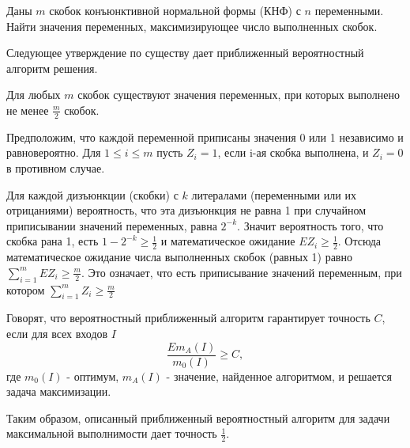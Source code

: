 \begin{problem}

 Даны $m$ скобок конъюнктивной нормальной формы (КНФ) с $n$ переменными. Найти значения переменных, максимизирующее число выполненных скобок.

\noindent  

\noindent Следующее утверждение по существу дает приближенный вероятностный алгоритм решения.

 Для любых $m$ скобок существуют значения переменных, при которых выполнено не менее $\frac{m}{2} $ скобок.

\noindent Предположим, что каждой переменной приписаны значения 0 или 1 независимо и равновероятно. Для $1\le i\le m$ пусть $Z_{i} =1$, если i-ая скобка выполнена, и $Z_{i} =0$ в противном случае.

\noindent Для каждой дизъюнкции (скобки) с $k$ литералами (переменными или их отрицаниями) вероятность, что эта дизъюнкция не равна 1 при случайном приписывании значений переменных, равна $2^{-k} $. Значит вероятность того, что скобка рана 1, есть $1-2^{-k} \ge \frac{1}{2} $ и математическое ожидание $EZ_{i} \ge \frac{1}{2} $. Отсюда математическое ожидание числа выполненных скобок (равных 1) равно $\sum _{i=1}^{m}EZ_{i}  \ge \frac{m}{2} $. Это означает, что есть приписывание значений переменным, при котором $\sum _{i=1}^{m}Z_{i}  \ge \frac{m}{2} $

 Говорят, что вероятностный приближенный алгоритм гарантирует точность $C$, если для всех входов $I$
\[\frac{Em_{A} (I)}{m_{0} (I)} \ge C,\] 
где $m_{0} (I)$ - оптимум, $m_{A} (I)$ - значение, найденное алгоритмом, и решается задача максимизации. 

\noindent 

 Таким образом, описанный приближенный вероятностный алгоритм для задачи максимальной выполнимости дает точность $\frac{1}{2} $.

\noindent 


\end{problem}
